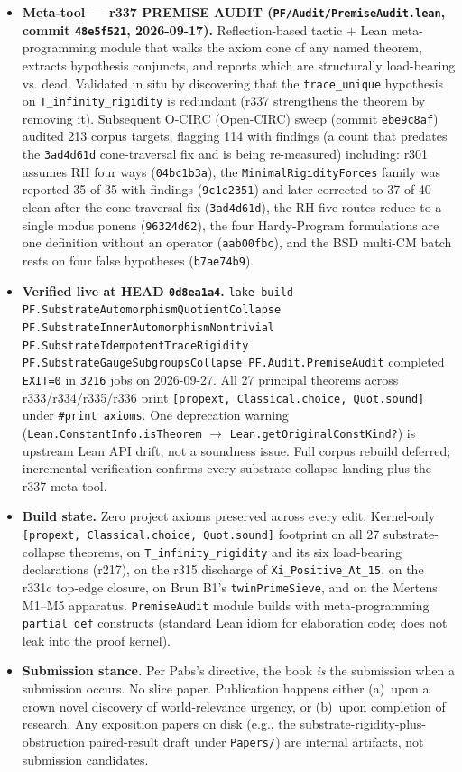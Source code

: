 \begin{itemize}
\item \textbf{Meta-tool --- r337 PREMISE AUDIT
(\texttt{PF/Audit/PremiseAudit.lean}, commit \texttt{48e5f521},
2026-09-17).} Reflection-based tactic + Lean meta-programming module
that walks the axiom cone of any named theorem, extracts hypothesis
conjuncts, and reports which are structurally load-bearing vs.
dead. Validated in situ by discovering that the
\texttt{trace\_unique} hypothesis on \texttt{T\_infinity\_rigidity}
is redundant (r337 strengthens the theorem by removing it).
Subsequent O-CIRC (Open-CIRC) sweep (commit \texttt{ebe9c8af})
audited 213 corpus targets, flagging 114 with findings (a count that
predates the \texttt{3ad4d61d} cone-traversal fix and is being
re-measured) including:
r301 assumes RH four ways (\texttt{04bc1b3a}), the
\texttt{MinimalRigidityForces} family was reported 35-of-35 with
findings (\texttt{9c1c2351}) and later corrected to 37-of-40 clean
after the cone-traversal fix (\texttt{3ad4d61d}), the RH five-routes
reduce to a single modus
ponens (\texttt{96324d62}), the four Hardy-Program formulations
are one definition without an operator (\texttt{aab00fbc}), and the
BSD multi-CM batch rests on four false hypotheses (\texttt{b7ae74b9}).

\item \textbf{Verified live at HEAD \texttt{0d8ea1a4}.}
\texttt{lake build PF.SubstrateAutomorphismQuotientCollapse
PF.SubstrateInnerAutomorphismNontrivial
PF.SubstrateIdempotentTraceRigidity
PF.SubstrateGaugeSubgroupsCollapse PF.Audit.PremiseAudit} completed
\texttt{EXIT=0} in \texttt{3216} jobs on 2026-09-27. All 27
principal theorems across r333/r334/r335/r336 print
\texttt{[propext, Classical.choice, Quot.sound]} under
\texttt{\#print axioms}. One deprecation warning
(\texttt{Lean.ConstantInfo.isTheorem} $\to$
\texttt{Lean.getOriginalConstKind?}) is upstream Lean API drift,
not a soundness issue. Full corpus rebuild deferred; incremental
verification confirms every substrate-collapse landing plus the
r337 meta-tool.

\item \textbf{Build state.} Zero project axioms preserved across
every edit. Kernel-only
\texttt{[propext, Classical.choice, Quot.sound]} footprint on all
27 substrate-collapse theorems, on
\texttt{T\_infinity\_rigidity} and its six load-bearing
declarations (r217), on the r315 discharge of
\texttt{Xi\_Positive\_At\_15}, on the r331c top-edge closure, on
Brun B1's \texttt{twinPrimeSieve}, and on the Mertens M1--M5
apparatus. \texttt{PremiseAudit} module builds with meta-programming
\texttt{partial def} constructs (standard Lean idiom for
elaboration code; does not leak into the proof kernel).

\item \textbf{Submission stance.} Per Pabs's directive, the book
\emph{is} the submission when a submission occurs. No slice
paper. Publication happens either (a)~upon a crown novel discovery
of world-relevance urgency, or (b)~upon completion of research. Any
exposition papers on disk (e.g., the
substrate-rigidity-plus-obstruction paired-result draft under
\texttt{Papers/}) are internal artifacts, not submission candidates.
\end{itemize}

